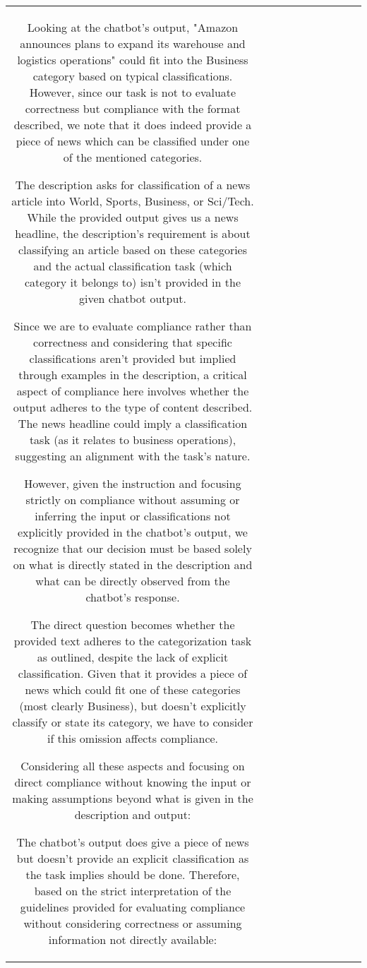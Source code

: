 \begin{table}[h!]
\begin{tabular}{|c|c|c|c|c|c|c|c|c|c|}
Looking at the chatbot's output, "Amazon announces plans to expand its warehouse and logistics operations" could fit into the Business category based on typical classifications. However, since our task is not to evaluate correctness but compliance with the format described, we note that it does indeed provide a piece of news which can be classified under one of the mentioned categories.

The description asks for classification of a news article into World, Sports, Business, or Sci/Tech. While the provided output gives us a news headline, the description's requirement is about classifying an article based on these categories and the actual classification task (which category it belongs to) isn't provided in the given chatbot output.

Since we are to evaluate compliance rather than correctness and considering that specific classifications aren't provided but implied through examples in the description, a critical aspect of compliance here involves whether the output adheres to the type of content described. The news headline could imply a classification task (as it relates to business operations), suggesting an alignment with the task's nature.

However, given the instruction and focusing strictly on compliance without assuming or inferring the input or classifications not explicitly provided in the chatbot's output, we recognize that our decision must be based solely on what is directly stated in the description and what can be directly observed from the chatbot's response.

The direct question becomes whether the provided text adheres to the categorization task as outlined, despite the lack of explicit classification. Given that it provides a piece of news which could fit one of these categories (most clearly Business), but doesn't explicitly classify or state its category, we have to consider if this omission affects compliance.

Considering all these aspects and focusing on direct compliance without knowing the input or making assumptions beyond what is given in the description and output:

The chatbot's output does give a piece of news but doesn't provide an explicit classification as the task implies should be done. Therefore, based on the strict interpretation of the guidelines provided for evaluating compliance without considering correctness or assuming information not directly available:


\end{tabular}
\end{table}
